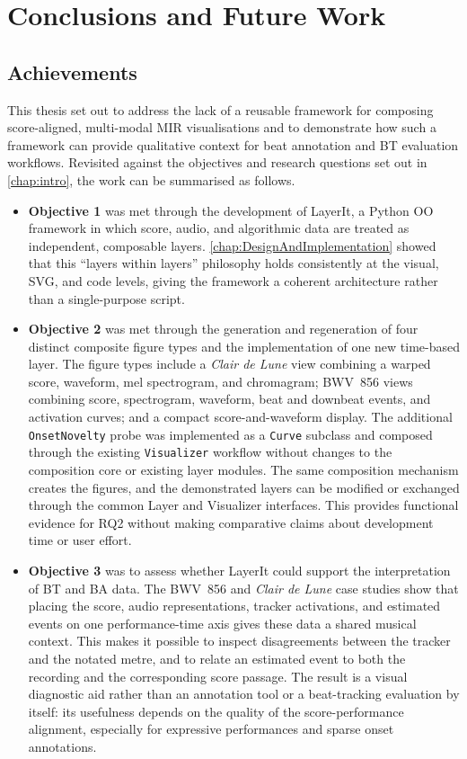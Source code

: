 \chapter{Conclusions and Future Work} \label{chap:conclusion}
\section{Achievements}

This thesis set out to address the lack of a reusable framework for composing score-aligned, multi-modal MIR visualisations and to demonstrate how such a framework can provide qualitative context for beat annotation and BT evaluation workflows. Revisited against the objectives and research questions set out in \autoref{chap:intro}, the work can be summarised as follows.

\begin{itemize}
    \item \textbf{Objective 1} was met through the development of LayerIt, a Python OO framework in which score, audio, and algorithmic data are treated as independent, composable layers. \autoref{chap:DesignAndImplementation} showed that this ``layers within layers'' philosophy holds consistently at the visual, SVG, and code levels, giving the framework a coherent architecture rather than a single-purpose script.

    \item \textbf{Objective 2} was met through the generation and regeneration of four distinct composite figure types and the implementation of one new time-based layer. The figure types include a \textit{Clair de Lune} view combining a warped score, waveform, mel spectrogram, and chromagram; BWV~856 views combining score, spectrogram, waveform, beat and downbeat events, and activation curves; and a compact score-and-waveform display. The additional \texttt{OnsetNovelty} probe was implemented as a \texttt{Curve} subclass and composed through the existing \texttt{Visualizer} workflow without changes to the composition core or existing layer modules. The same composition mechanism creates the figures, and the demonstrated layers can be modified or exchanged through the common Layer and Visualizer interfaces. This provides functional evidence for RQ2 without making comparative claims about development time or user effort.

    \item \textbf{Objective 3} was to assess whether LayerIt could support the interpretation of BT and BA data. The BWV~856 and \textit{Clair de Lune} case studies show that placing the score, audio representations, tracker activations, and estimated events on one performance-time axis gives these data a shared musical context. This makes it possible to inspect disagreements between the tracker and the notated metre, and to relate an estimated event to both the recording and the corresponding score passage. The result is a visual diagnostic aid rather than an annotation tool or a beat-tracking evaluation by itself: its usefulness depends on the quality of the score-performance alignment, especially for expressive performances and sparse onset annotations.
\end{itemize}

